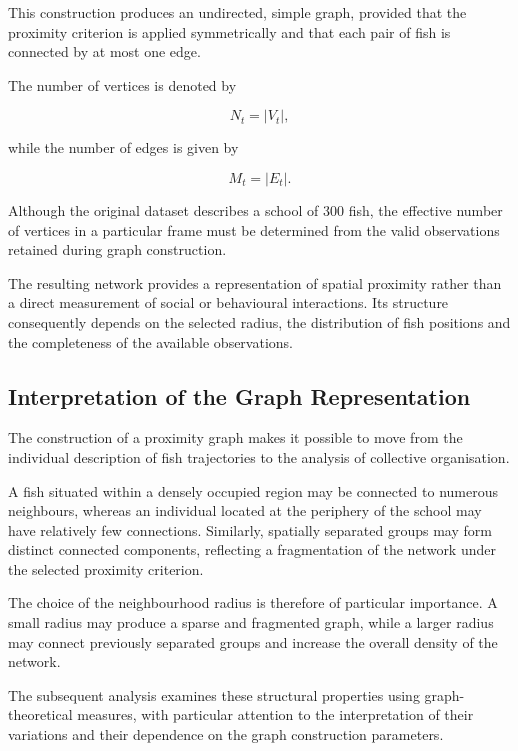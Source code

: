 \documentclass[10pt,a4paper]{article}
\begin{document}
This construction produces an undirected, simple graph,
provided that the proximity criterion is applied
symmetrically and that each pair of fish is connected
by at most one edge.

The number of vertices is denoted by

\begin{equation}
N_t=|V_t|,
\end{equation}

while the number of edges is given by

\begin{equation}
M_t=|E_t|.
\end{equation}

Although the original dataset describes a school of 300 fish,
the effective number of vertices in a particular frame must
be determined from the valid observations retained during
graph construction.

The resulting network provides a representation of spatial
proximity rather than a direct measurement of social or
behavioural interactions. Its structure consequently depends
on the selected radius, the distribution of fish positions
and the completeness of the available observations.

\subsection{Interpretation of the Graph Representation}

The construction of a proximity graph makes it possible to
move from the individual description of fish trajectories
to the analysis of collective organisation.

A fish situated within a densely occupied region may be
connected to numerous neighbours, whereas an individual
located at the periphery of the school may have relatively
few connections. Similarly, spatially separated groups may
form distinct connected components, reflecting a
fragmentation of the network under the selected proximity
criterion.

The choice of the neighbourhood radius is therefore of
particular importance. A small radius may produce a sparse
and fragmented graph, while a larger radius may connect
previously separated groups and increase the overall
density of the network.

The subsequent analysis examines these structural
properties using graph-theoretical measures, with particular
attention to the interpretation of their variations and
their dependence on the graph construction parameters.
\end{document}
